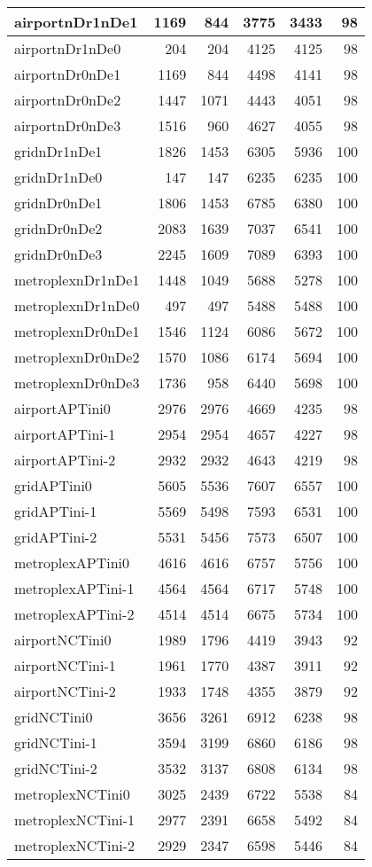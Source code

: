 \begin{longtable}{|l|r|r|r|r|r|}
\endlastfoot
airportnDr1nDe1 & 1169 & 844 & 3775 & 3433 & 98 \\ \hline
airportnDr1nDe0 & 204 & 204 & 4125 & 4125 & 98 \\ \hline
airportnDr0nDe1 & 1169 & 844 & 4498 & 4141 & 98 \\ \hline
airportnDr0nDe2 & 1447 & 1071 & 4443 & 4051 & 98 \\ \hline
airportnDr0nDe3 & 1516 & 960 & 4627 & 4055 & 98 \\ \hline
gridnDr1nDe1 & 1826 & 1453 & 6305 & 5936 & 100 \\ \hline
gridnDr1nDe0 & 147 & 147 & 6235 & 6235 & 100 \\ \hline
gridnDr0nDe1 & 1806 & 1453 & 6785 & 6380 & 100 \\ \hline
gridnDr0nDe2 & 2083 & 1639 & 7037 & 6541 & 100 \\ \hline
gridnDr0nDe3 & 2245 & 1609 & 7089 & 6393 & 100 \\ \hline
metroplexnDr1nDe1 & 1448 & 1049 & 5688 & 5278 & 100 \\ \hline
metroplexnDr1nDe0 & 497 & 497 & 5488 & 5488 & 100 \\ \hline
metroplexnDr0nDe1 & 1546 & 1124 & 6086 & 5672 & 100 \\ \hline
metroplexnDr0nDe2 & 1570 & 1086 & 6174 & 5694 & 100 \\ \hline
metroplexnDr0nDe3 & 1736 & 958 & 6440 & 5698 & 100 \\ \hline
airportAPTini0 & 2976 & 2976 & 4669 & 4235 & 98 \\ \hline
airportAPTini-1 & 2954 & 2954 & 4657 & 4227 & 98 \\ \hline
airportAPTini-2 & 2932 & 2932 & 4643 & 4219 & 98 \\ \hline
gridAPTini0 & 5605 & 5536 & 7607 & 6557 & 100 \\ \hline
gridAPTini-1 & 5569 & 5498 & 7593 & 6531 & 100 \\ \hline
gridAPTini-2 & 5531 & 5456 & 7573 & 6507 & 100 \\ \hline
metroplexAPTini0 & 4616 & 4616 & 6757 & 5756 & 100 \\ \hline
metroplexAPTini-1 & 4564 & 4564 & 6717 & 5748 & 100 \\ \hline
metroplexAPTini-2 & 4514 & 4514 & 6675 & 5734 & 100 \\ \hline
airportNCTini0 & 1989 & 1796 & 4419 & 3943 & 92 \\ \hline
airportNCTini-1 & 1961 & 1770 & 4387 & 3911 & 92 \\ \hline
airportNCTini-2 & 1933 & 1748 & 4355 & 3879 & 92 \\ \hline
gridNCTini0 & 3656 & 3261 & 6912 & 6238 & 98 \\ \hline
gridNCTini-1 & 3594 & 3199 & 6860 & 6186 & 98 \\ \hline
gridNCTini-2 & 3532 & 3137 & 6808 & 6134 & 98 \\ \hline
metroplexNCTini0 & 3025 & 2439 & 6722 & 5538 & 84 \\ \hline
metroplexNCTini-1 & 2977 & 2391 & 6658 & 5492 & 84 \\ \hline
metroplexNCTini-2 & 2929 & 2347 & 6598 & 5446 & 84 \\ \hline
\end{longtable}
